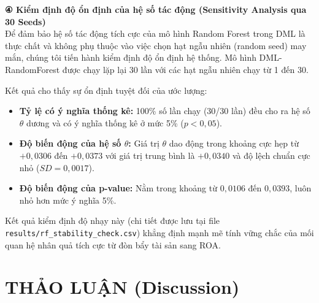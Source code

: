 \documentclass[12pt,a4paper]{article}
\begin{document}
\noindent\textbf{④ Kiểm định độ ổn định của hệ số tác động (Sensitivity Analysis qua 30 Seeds)} \\
Để đảm bảo hệ số tác động tích cực của mô hình Random Forest trong DML là thực chất và không phụ thuộc vào việc chọn hạt ngẫu nhiên (random seed) may mắn, chúng tôi tiến hành kiểm định độ ổn định hệ thống. Mô hình DML-RandomForest được chạy lặp lại 30 lần với các hạt ngẫu nhiên chạy từ 1 đến 30.

Kết quả cho thấy sự ổn định tuyệt đối của ước lượng:
\begin{itemize}
    \item \textbf{Tỷ lệ có ý nghĩa thống kê:} 100\% số lần chạy (30/30 lần) đều cho ra hệ số $\theta$ dương và có ý nghĩa thống kê ở mức 5\% ($p < 0,05$).
    \item \textbf{Độ biến động của hệ số $\theta$:} Giá trị $\theta$ dao động trong khoảng cực hẹp từ $+0,0306$ đến $+0,0373$ với giá trị trung bình là $+0,0340$ và độ lệch chuẩn cực nhỏ ($SD = 0,0017$).
    \item \textbf{Độ biến động của p-value:} Nằm trong khoảng từ $0,0106$ đến $0,0393$, luôn nhỏ hơn mức ý nghĩa 5\%.
\end{itemize}
Kết quả kiểm định độ nhạy này (chi tiết được lưu tại file \texttt{results/rf\_stability\_check.csv}) khẳng định mạnh mẽ tính vững chắc của mối quan hệ nhân quả tích cực từ đòn bẩy tài sản sang ROA.

\section{THẢO LUẬN (Discussion)}
\end{document}
